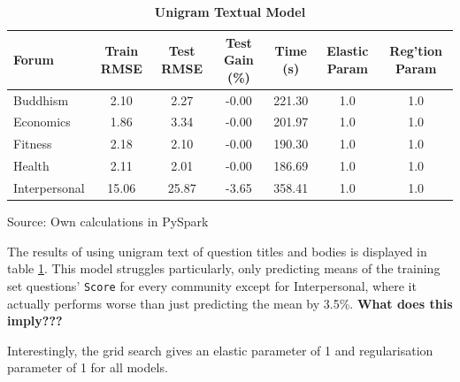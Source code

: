 \documentclass[11pt,preprint, authoryear]{article}
\numberwithin{equation}{section}
\begin{document}
\begin{longtable}[htbp] {@{} lcccccc @{}} 
\caption{\textbf{Unigram Textual Model}} 
\label{tab:rand_token_model} \\
\toprule
\textbf{Forum} &  \textbf{Train RMSE} &  \textbf{Test RMSE} &  \textbf{Test Gain (\%)} &  \textbf{Time (s)} & \textbf{Elastic Param} &  \textbf{Reg'tion Param} \\
\midrule
Buddhism      &              2.10 &           2.27 &           -0.00 &          221.30 &               1.0 &               1.0 \\
Economics     &              1.86 &           3.34 &           -0.00 &          201.97 &               1.0 &               1.0 \\
Fitness       &              2.18 &           2.10 &           -0.00 &          190.30 &               1.0 &               1.0 \\
Health        &              2.11 &           2.01 &           -0.00 &          186.69 &               1.0 &               1.0 \\
Interpersonal &             15.06 &          25.87 &           -3.65 &          358.41 &               1.0 &               1.0 \\
\bottomrule
\end{longtable}\begin{center} Source: Own calculations in PySpark\end{center}

\normalsize

The results of using unigram text of question titles and bodies is
displayed in table \ref{tab:rand_token_model}. This model struggles
particularly, only predicting means of the training set questions'
\texttt{Score} for every community except for Interpersonal, where it
actually performs worse than just predicting the mean by 3.5\%.
\textbf{What does this imply???}

Interestingly, the grid search gives an elastic parameter of 1 and
regularisation parameter of 1 for all models.

\footnotesize
\end{document}
